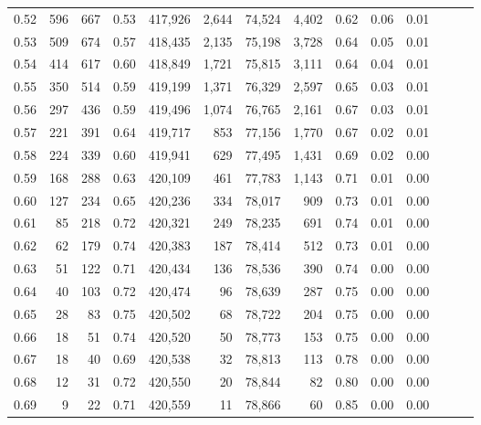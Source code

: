\begin{tabular}{rrrrrrrrrrrrrr}
0.52 &     596 &    667 &  0.53 &  417,926 &    2,644 &  74,524 &   4,402 &  0.62 &  0.06 &      0.01 \\
0.53 &     509 &    674 &  0.57 &  418,435 &    2,135 &  75,198 &   3,728 &  0.64 &  0.05 &      0.01 \\
0.54 &     414 &    617 &  0.60 &  418,849 &    1,721 &  75,815 &   3,111 &  0.64 &  0.04 &      0.01 \\
0.55 &     350 &    514 &  0.59 &  419,199 &    1,371 &  76,329 &   2,597 &  0.65 &  0.03 &      0.01 \\
0.56 &     297 &    436 &  0.59 &  419,496 &    1,074 &  76,765 &   2,161 &  0.67 &  0.03 &      0.01 \\
0.57 &     221 &    391 &  0.64 &  419,717 &      853 &  77,156 &   1,770 &  0.67 &  0.02 &      0.01 \\
0.58 &     224 &    339 &  0.60 &  419,941 &      629 &  77,495 &   1,431 &  0.69 &  0.02 &      0.00 \\
0.59 &     168 &    288 &  0.63 &  420,109 &      461 &  77,783 &   1,143 &  0.71 &  0.01 &      0.00 \\
0.60 &     127 &    234 &  0.65 &  420,236 &      334 &  78,017 &     909 &  0.73 &  0.01 &      0.00 \\
0.61 &      85 &    218 &  0.72 &  420,321 &      249 &  78,235 &     691 &  0.74 &  0.01 &      0.00 \\
0.62 &      62 &    179 &  0.74 &  420,383 &      187 &  78,414 &     512 &  0.73 &  0.01 &      0.00 \\
0.63 &      51 &    122 &  0.71 &  420,434 &      136 &  78,536 &     390 &  0.74 &  0.00 &      0.00 \\
0.64 &      40 &    103 &  0.72 &  420,474 &       96 &  78,639 &     287 &  0.75 &  0.00 &      0.00 \\
0.65 &      28 &     83 &  0.75 &  420,502 &       68 &  78,722 &     204 &  0.75 &  0.00 &      0.00 \\
0.66 &      18 &     51 &  0.74 &  420,520 &       50 &  78,773 &     153 &  0.75 &  0.00 &      0.00 \\
0.67 &      18 &     40 &  0.69 &  420,538 &       32 &  78,813 &     113 &  0.78 &  0.00 &      0.00 \\
0.68 &      12 &     31 &  0.72 &  420,550 &       20 &  78,844 &      82 &  0.80 &  0.00 &      0.00 \\
0.69 &       9 &     22 &  0.71 &  420,559 &       11 &  78,866 &      60 &  0.85 &  0.00 &      0.00 \\

\end{tabular}
